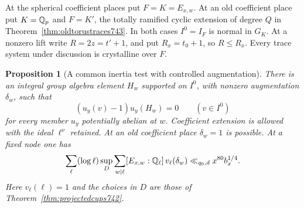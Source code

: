 \documentclass[a4paper,11pt]{article}
\newtheorem{proposition}{Proposition}[section]
\theoremstyle{definition}
\theoremstyle{remark}
\numberwithin{equation}{section}
\begin{document}
At the spherical coefficient places put \(F=K=E_{x,w}\).
At an old coefficient place put \(K=\mathbb Q_p\) and \(F=K'\),
the totally ramified cyclic extension of degree \(Q\) in
Theorem~\ref{thm:oldtorustraces743}. In both cases \(I^0=I_F\)
is normal in \(G_K\). At a nonzero lift write \(R=2z=t'+1\),
and put \(R_x=t_0+1\), so \(R\le R_x\). Every trace system
under discussion is crystalline over \(F\).

\begin{proposition}[A common inertia test with controlled augmentation]
\leavevmode\label{prop:potunits746}
There is an integral group algebra element \(H_w\) supported on
\(I^0\), with nonzero augmentation \(\delta_w\), such that
\[
       (u_y(v)-1)u_y(H_w)=0\qquad (v\in I^0)
\]
for every member \(u_y\) potentially abelian at \(w\).
Coefficient extension is allowed with the ideal \(\ell^\nu\)
retained. At an old coefficient place \(\delta_w=1\) is possible.
At a fixed node one has
\[
 \sum_\ell(\log\ell)\sup_D
       \sum_{w\mid\ell}[E_{x,w}:\mathbb Q_\ell]\,v_\ell(\delta_w)
              \ll_{q_0,d} x^{80} b_x^{1/4}.
\]
Here \(v_\ell(\ell)=1\) and the choices in \(D\) are those of
Theorem~\ref{thm:projectedcups742}.
\end{proposition}
\end{document}
